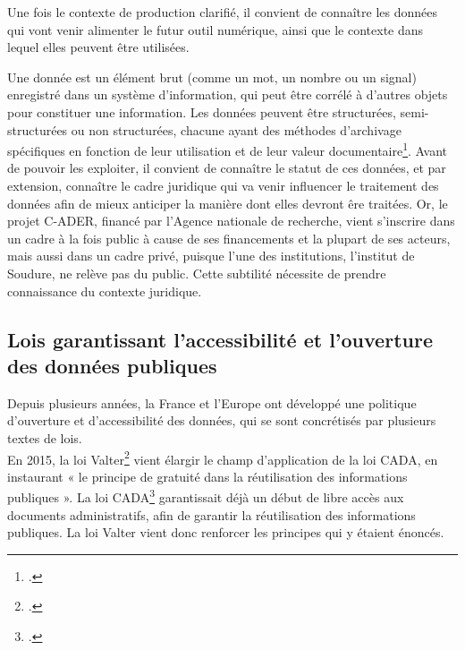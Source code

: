 Une fois le contexte de production clarifié, il convient de connaître les données qui vont venir alimenter le futur outil numérique,  ainsi que le contexte dans lequel elles peuvent être utilisées.

Une donnée est un élément brut (comme un mot, un nombre ou un signal) enregistré dans un système d'information, qui peut être corrélé à d'autres objets pour constituer une information. Les données peuvent être structurées, semi-structurées ou non structurées, chacune ayant des méthodes d'archivage spécifiques en fonction de leur utilisation et de leur valeur documentaire\footcite{chabinGlossaireArchivage2010}. Avant de pouvoir les exploiter, il convient de connaître le statut de ces données, et par extension, connaître le cadre juridique qui va venir influencer le traitement des données afin de mieux anticiper la manière dont elles devront êre traitées. Or, le projet C-ADER, financé par l’Agence nationale de recherche, vient s’inscrire dans un cadre à la fois public à cause de ses financements et la plupart de ses acteurs, mais aussi dans un cadre privé, puisque l’une des institutions, l’institut de Soudure, ne relève pas du public. Cette subtilité nécessite de prendre connaissance du contexte juridique.

        \subsection{Lois garantissant l’accessibilité et l’ouverture des données publiques}

Depuis plusieurs années, la France et l’Europe ont développé une politique d'ouverture et d'accessibilité des données, qui se sont concrétisés par plusieurs textes de lois.\\

En 2015, la loi Valter\footcite{LOI20151779282015} vient élargir le champ d'application de la loi CADA, en instaurant « le principe de gratuité dans la réutilisation des informations publiques ». La loi CADA\footcite{Loi7875317} garantissait déjà un début de libre accès aux documents administratifs, afin de garantir la réutilisation des informations publiques. La loi Valter vient donc renforcer les principes qui y étaient énoncés.\\

